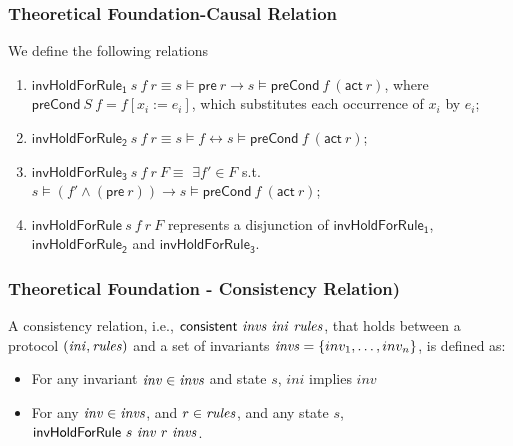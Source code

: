 \documentclass{beamer}
\begin{document}
\begin{frame}\frametitle{Theoretical Foundation-Causal Relation}



We define the following relations
\begin{enumerate}
\item $\mathsf{invHoldForRule_1}~s ~f ~r \equiv  s \models \mathsf{pre}~ r \longrightarrow s \models \mathsf{preCond}~ f ~(\mathsf{act}~ r)$, where $\mathsf{preCond}~S~f=f[x_i:=e_i]$, which substitutes each
occurrence of $x_i$ by $e_i$;
\item $\mathsf{invHoldForRule_2}~s~ f~ r \equiv  s \models f \longleftrightarrow  s \models\mathsf{preCond}~ f~(\mathsf{act}~ r)$;
\item $\mathsf{invHoldForRule_3}~s~ f~ r ~F \equiv$  $\exists f' \in F$ s.t.
$s \models (f' \wedge (\mathsf{pre}~ r)) \longrightarrow s \models \mathsf{preCond} ~f ~(\mathsf{act}   ~r)$;
\item $\mathsf{invHoldForRule}~s~ f~ r ~F$ represents a disjunction of $\mathsf{invHoldForRule_1}$, $\mathsf{invHoldForRule_2}$
and $\mathsf{invHoldForRule_3}$.
\end{enumerate}
\end{frame}

\begin{frame}\frametitle{Theoretical Foundation - Consistency Relation)}


A consistency relation, i.e., $\mathsf{consistent}~ {\it invs} ~{\it ini}~ {\it rules}$,
that holds between a protocol $({\it ini}, {\it rules})$ and
a set of invariants ${\it invs}=\{inv_1,\ldots, inv_n\}$,  is defined as:
%
\begin{itemize}
\item For any invariant ${\it inv} \in {\it invs}$ and state $s$, $ini$ implies $inv$

\item For any ${\it inv} \in {\it invs}$,  and $r\in {\it rules}$, and any state $s$,
$\mathsf{invHoldForRule}~s~{\it inv}~r~{\it invs}$.
\end{itemize}


\end{frame}
\end{document}
